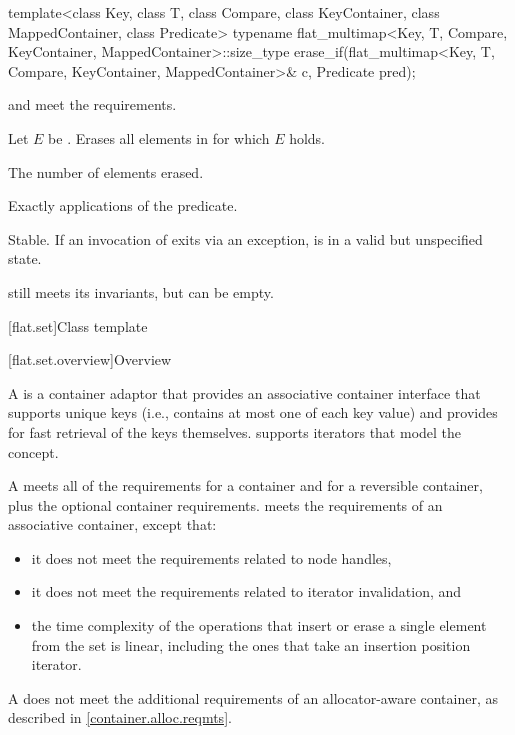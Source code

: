 %
\begin{itemdecl}
template<class Key, class T, class Compare, class KeyContainer, class MappedContainer,
         class Predicate>
  typename flat_multimap<Key, T, Compare, KeyContainer, MappedContainer>::size_type
    erase_if(flat_multimap<Key, T, Compare, KeyContainer, MappedContainer>& c, Predicate pred);
\end{itemdecl}

\begin{itemdescr}
\pnum
\expects
{} and  meet the  requirements.

\pnum
\effects
Let $E$ be .
Erases all elements  in  for which $E$ holds.

\pnum
\returns
The number of elements erased.

\pnum
\complexity
Exactly  applications of the predicate.

\pnum
\remarks
Stable.
If an invocation of  exits via an exception,
 is in a valid but unspecified state.
\begin{note}
 still meets its invariants,
but can be empty.
\end{note}
\end{itemdescr}

[flat.set]{Class template }

[flat.set.overview]{Overview}

\pnum
{}%
A  is a container adaptor
that provides an associative container interface
that supports unique keys
(i.e., contains at most one of each key value) and
provides for fast retrieval of the keys themselves.
 supports iterators that model
the  concept.

\pnum
A  meets all of the requirements
for a container and
for a reversible container,
plus the optional container requirements.
 meets the requirements of
an associative container, except that:
\begin{itemize}
\item
it does not meet the requirements
related to node handles,
\item
it does not meet the requirements related to iterator invalidation, and
\item
the time complexity of the operations
that insert or erase a single element from the set
is linear,
including the ones that take an insertion position iterator.
\end{itemize}
\begin{note}
A  does not meet
the additional requirements of an allocator-aware container,
as described in \ref{container.alloc.reqmts}.
\end{note}

